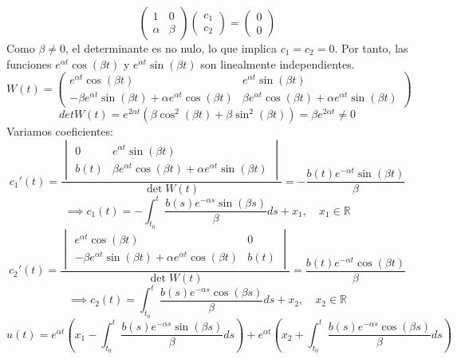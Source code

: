 {    \[
        \begin{pmatrix}
            1 & 0 \\
            \alpha & \beta
        \end{pmatrix} \begin{pmatrix}
            c_1 \\
            c_2
        \end{pmatrix} = \begin{pmatrix}
            0 \\
            0
        \end{pmatrix}
    \]
    Como $\beta \neq 0$, el determinante es no nulo, lo que implica $c_1 = c_2 = 0$. Por tanto, las funciones $e^{\alpha t} \cos(\beta t)$ y $e^{\alpha t} \sin(\beta t)$ son linealmente independientes.
    \[
        W(t) = \begin{pmatrix}
            e^{\alpha t} \cos(\beta t) & e^{\alpha t} \sin(\beta t) \\
            -\beta e^{\alpha t} \sin(\beta t) + \alpha e^{\alpha t} \cos(\beta t) & \beta e^{\alpha t} \cos(\beta t) + \alpha e^{\alpha t} \sin(\beta t)
        \end{pmatrix}
    \]
    \[
        det W(t) = e^{2 \alpha t} (\beta \cos^2(\beta t) + \beta \sin^2(\beta t)) = \beta e^{2 \alpha t} \neq 0
    \]
    Variamos coeficientes:
    \[
        c_1'(t) = \frac{\begin{vmatrix}
            0 & e^{\alpha t} \sin(\beta t) \\
            b(t) & \beta e^{\alpha t} \cos(\beta t) + \alpha e^{\alpha t} \sin(\beta t)
        \end{vmatrix}}{\det W(t)} = -\frac{b(t)e^{-\alpha t} \sin(\beta t)}{\beta} 
    \]
    \[
        \implies c_1(t) = -\int_{t_0}^{t} \frac{b(s)e^{-\alpha s} \sin(\beta s)}{\beta} ds + x_1, \quad x_1 \in \mathbb{R}
    \]
    \[
        c_2'(t) = \frac{\begin{vmatrix}
            e^{\alpha t} \cos(\beta t) & 0 \\
            -\beta e^{\alpha t} \sin(\beta t) + \alpha e^{\alpha t} \cos(\beta t) & b(t)
        \end{vmatrix}}{\det W(t)} = \frac{b(t)e^{-\alpha t} \cos(\beta t)}{\beta}
    \]
    \[
        \implies c_2(t) = \int_{t_0}^{t} \frac{b(s)e^{-\alpha s} \cos(\beta s)}{\beta} ds + x_2, \quad x_2 \in \mathbb{R}
    \]
    \[
        u(t) = e^{\alpha t} \left( x_1 - \int_{t_0}^{t} \frac{b(s)e^{-\alpha s} \sin(\beta s)}{\beta} ds \right) + e^{\alpha t} \left( x_2 + \int_{t_0}^{t} \frac{b(s)e^{-\alpha s} \cos(\beta s)}{\beta} ds \right)
    \]
}

